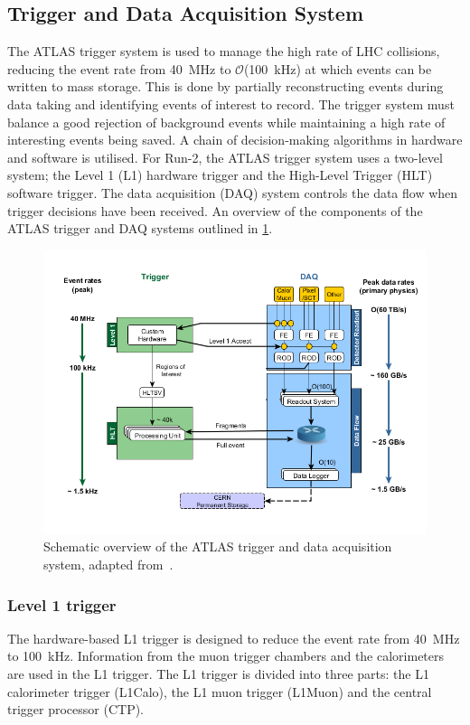 \subsection{Trigger and Data Acquisition System}\label{sec:method:ATLAS:trigger}
The ATLAS trigger system is used to manage the high rate of LHC collisions, reducing the event rate from \SI{40}{\mega\hertz} to $\mathcal{O}$(\SI{100}{\kilo\hertz}) at which events can be written to mass storage. This is done by partially reconstructing events during data taking and identifying events of interest to record. The trigger system must balance a good rejection of background events while maintaining a high rate of interesting events being saved. A chain of decision-making algorithms in hardware and software is utilised. For Run-2, the ATLAS trigger system uses a two-level system; the Level 1 (L1) hardware trigger and the High-Level Trigger (HLT) software trigger. The data acquisition (DAQ) system controls the data flow when trigger decisions have been received. An overview of the components of the ATLAS trigger and DAQ systems outlined in \cref{fig:method:ATLAS:TDAQ}.
\begin{figure}[!htpb]
    \centering
    \includegraphics[width=\largefigwidth]{images/tdaqFullNew2017.png}
    \caption[Overview of the ATLAS trigger and data acquisition system]{Schematic overview of the ATLAS trigger and data acquisition system, adapted from~\cite{ATLAS:TDAQ-Run2}.}
    \label{fig:method:ATLAS:TDAQ}
\end{figure}

\subsubsection{Level 1 trigger}
The hardware-based L1 trigger is designed to reduce the event rate from \SI{40}{\mega\hertz} to \SI{100}{\kilo\hertz}. Information from the muon trigger chambers and the calorimeters are used in the L1 trigger. The L1 trigger is divided into three parts: the L1 calorimeter trigger (L1Calo), the L1 muon trigger (L1Muon) and the central trigger processor (CTP).

